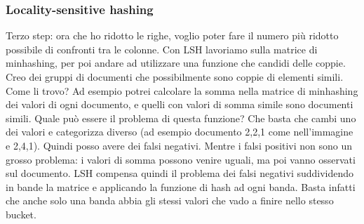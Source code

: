 \subsubsection{Locality-sensitive hashing}
Terzo step: ora che ho ridotto le righe, voglio poter fare il numero più ridotto possibile di confronti tra le colonne. Con LSH lavoriamo sulla matrice di minhashing, per poi andare ad utilizzare una funzione che candidi delle coppie. Creo dei gruppi di documenti che possibilmente sono coppie di elementi simili. Come li trovo? Ad esempio potrei calcolare la somma nella matrice di minhashing  dei valori di ogni documento, e quelli con valori di somma simile sono documenti simili. Quale può essere il problema di questa funzione? Che basta che cambi uno dei valori e categorizza diverso (ad esempio documento 2,2,1 come nell'immagine e 2,4,1). Quindi posso avere dei falsi negativi. Mentre i falsi positivi non sono un grosso problema:  i valori di somma possono venire uguali, ma poi vanno osservati sul documento. LSH compensa quindi il problema dei falsi negativi suddividendo in bande la matrice e applicando la funzione di hash ad ogni banda. Basta infatti che anche solo una banda abbia gli stessi valori che vado a finire nello stesso bucket. 

\newpage

